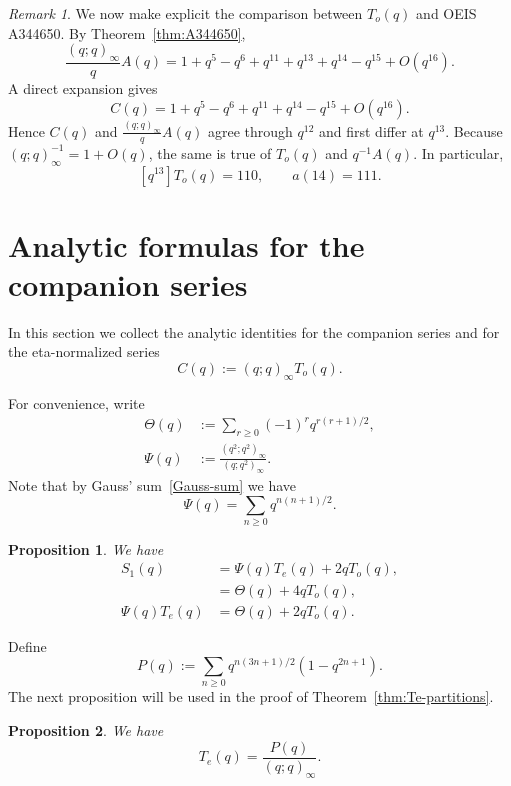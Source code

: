 \documentclass[reqno]{amsart}
\theoremstyle{plain}
\newtheorem{proposition}{Proposition}
\theoremstyle{definition}
\theoremstyle{remark}
\newtheorem{remark}{Remark}
\numberwithin{equation}{section}
\newcommand{\qpoch}[2]{(#1;#2)_\infty}
\begin{document}
\begin{remark}\label{rem:A344650-comparison}
We now make explicit the comparison between $T_o(q)$ and OEIS A344650. By Theorem~\ref{thm:A344650},
\[
\frac{(q;q)_\infty}{q}A(q)=1+q^5-q^6+q^{11}+q^{13}+q^{14}-q^{15}+O(q^{16}).
\]
A direct expansion gives
\[
C(q)=1+q^5-q^6+q^{11}+q^{14}-q^{15}+O(q^{16}).
\]
Hence $C(q)$ and $\frac{(q;q)_\infty}{q}A(q)$ agree through $q^{12}$ and first differ at $q^{13}$. Because $(q;q)_\infty^{-1}=1+O(q)$, the same is true of $T_o(q)$ and $q^{-1}A(q)$. In particular,
\[
[q^{13}]T_o(q)=110,
\qquad
 a(14)=111.
\]
\end{remark}
%
\section{Analytic formulas for the companion series}\label{sec:analytic}
%
In this section we collect the analytic identities for the companion series and for the eta-normalized series
\[
C(q):=(q;q)_\infty T_o(q).
\]

For convenience, write
\begin{align}
\Theta(q)&:=\sum_{r\ge 0}(-1)^r q^{r(r+1)/2},\label{Theta-def} \\
\Psi(q)&:=\frac{\qpoch{q^2}{q^2}}{\qpoch{q}{q^2}}.\label{Psi-def}
\end{align}
Note that by Gauss' sum~\eqref{Gauss-sum} we have
\begin{equation}
\Psi(q)=\sum_{n\ge 0}q^{n(n+1)/2}.
\end{equation}

\begin{proposition}\label{prop:companions}
We have
\begin{align}
S_1(q) &=\Psi(q)T_e(q)+2qT_o(q), \label{S1-id1}\\
&=\Theta(q)+4qT_o(q), \label{S1-id2} \\
\Psi(q)T_e(q)&=\Theta(q)+2qT_o(q). \label{cor:companions}
\end{align}
\end{proposition}

Define
\[
P(q):=\sum_{n\ge 0} q^{n(3n+1)/2}(1-q^{2n+1}).
\]
The next proposition will be used in the proof of Theorem~\ref{thm:Te-partitions}.

\begin{proposition}\label{prop:Te-closed}
We have
\begin{equation}\label{Te-closed}
T_e(q)=\frac{P(q)}{\qpoch{q}{q}}.
\end{equation}
\end{proposition}
\end{document}
